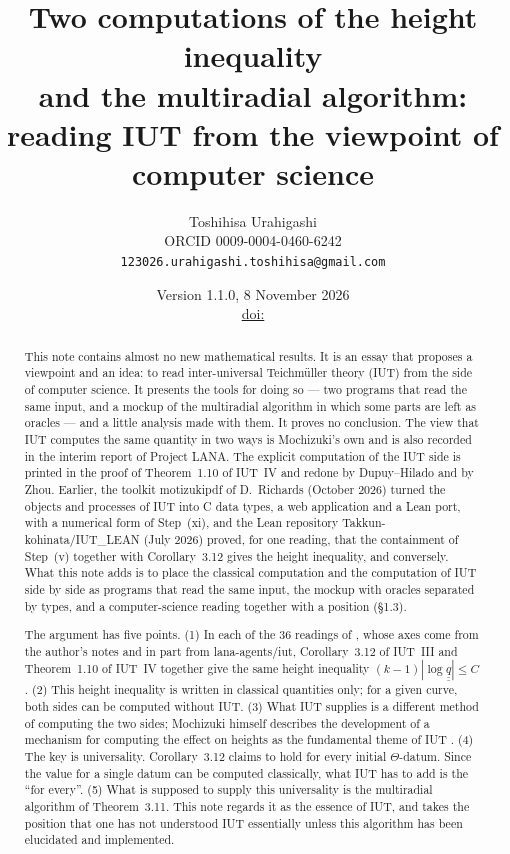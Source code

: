 \documentclass[11pt,a4paper]{article}
\title{Two computations of the height inequality\\ and the multiradial algorithm:\\ reading IUT from the viewpoint
of computer science}
\author{Toshihisa Urahigashi\\\small ORCID 0009-0004-0460-6242\\\small\texttt{123026.urahigashi.toshihisa@gmail.com}}
\date{Version 1.1.0, 8 November 2026\\\small\href{https://doi.org/\thedoi}{doi:\thedoi}}
\newcommand{\qq}{\underline{\underline{q}}}
\begin{document}
\maketitle

\begin{abstract}
This note contains almost no new mathematical results. It is an essay that proposes a viewpoint and an idea: to read
inter-universal Teichm\"uller theory (IUT) from the side of computer science. It presents the tools for doing so ---
two programs that read the same input, and a mockup of the multiradial algorithm in which some parts are left as
oracles --- and a little analysis made with them. It proves no conclusion. The view that IUT computes the same
quantity in two ways is Mochizuki's own and is also recorded in the interim report of Project LANA. The explicit
computation of the IUT side is printed in the proof of Theorem~1.10 of IUT~IV and redone by Dupuy--Hilado and by Zhou.
Earlier, the toolkit motizukipdf of D.~Richards (October 2026) turned the objects and processes of IUT into C data
types, a web application and a Lean port, with a numerical form of Step~(xi), and the Lean repository
Takkun-kohinata/IUT\_LEAN (July 2026) proved, for one reading, that the containment of Step~(v) together with
Corollary~3.12 gives the height inequality, and conversely. What this note adds is to place the classical computation
and the computation of IUT side by side as programs that read the same input, the mockup with oracles separated by
types, and a computer-science reading together with a position (\S1.3).

The argument has five points. (1) In each of the 36 readings of \cite{RF}, whose axes come from the author's notes and
in part from lana-agents/iut, Corollary~3.12 of IUT~III and Theorem~1.10 of IUT~IV together give the same height
inequality $(k-1)|\log\qq|\le C$ \cite{RF}. (2) This height inequality is written in classical quantities only; for a given curve,
both sides can be computed without IUT. (3) What IUT supplies is a different method of computing the two sides;
Mochizuki himself describes the development of a mechanism for computing the effect on heights as the fundamental
theme of IUT \cite{Alien}. (4) The key is universality. Corollary~3.12 claims to hold for every initial $\Theta$-datum.
Since the value for a single datum can be computed classically, what IUT has to add is the ``for every''. (5) What is
supposed to supply this universality is the multiradial algorithm of Theorem~3.11. This note regards it as the essence
of IUT, and takes the position that one has not understood IUT essentially unless this algorithm has been elucidated
and implemented.


\end{abstract}
\end{document}

